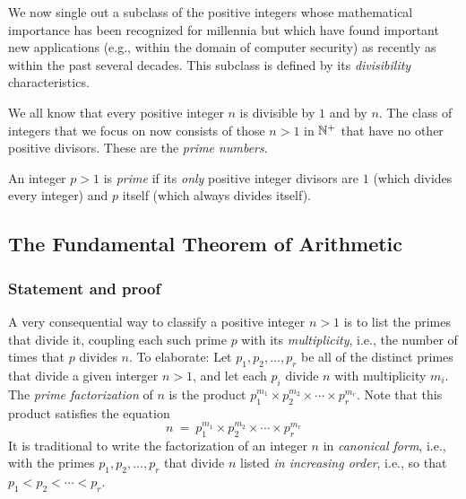 We now single out a subclass of the positive integers whose mathematical importance has been recognized for millennia but which have found important new applications (e.g., within the domain of computer security) as recently as within the past several decades.  This subclass is defined by its {\em divisibility} characteristics.

\medskip

We all know that every positive integer $n$ is divisible by $1$ and by $n$.  The class of integers that we focus on now consists of those $n > 1$ in $\mathbb{N}^+$ that have no other positive divisors.  These are the {\it prime numbers}.

\smallskip

 
An integer $p >1$ is {\it prime} if its {\em only} positive integer divisors are $1$ (which divides
every integer) and $p$ itself (which always divides itself).

\bigskip

\noindent {}
  
\subsection{The Fundamental Theorem of Arithmetic}
\label{sec:Fund-Thm-Arith}

\subsubsection{Statement and proof}
\label{sec:FTA-basics}

   

A very consequential way to classify a positive integer $n >1$ is to list the primes that divide it, coupling each such prime $p$ with its {\it multiplicity}, i.e., the number of times that $p$ divides $n$.  To elaborate: Let $p_1, p_2, \ldots, p_r$ be all of the distinct primes that divide a given interger $n >1$, and let each $p_i$ divide $n$ with multiplicity $m_i$.  The {\it prime factorization} of $n$ is the product $p_1^{m_1} \times p_2^{m_2} \times \cdots \times p_r^{m_r}$.  Note that this product satisfies the equation
\begin{equation}
\label{eq:prime-factorization}
n \ = \ p_1^{m_1} \times p_2^{m_2} \times \cdots \times p_r^{m_r}
\end{equation}
It is traditional to write the factorization of an integer $n$ in {\it canonical form}, i.e., with the primes $p_1, p_2, \ldots, p_r$ that divide $n$ listed {\em in increasing order}, i.e., so that $p_1 < p_2 < \cdots < p_r$.


